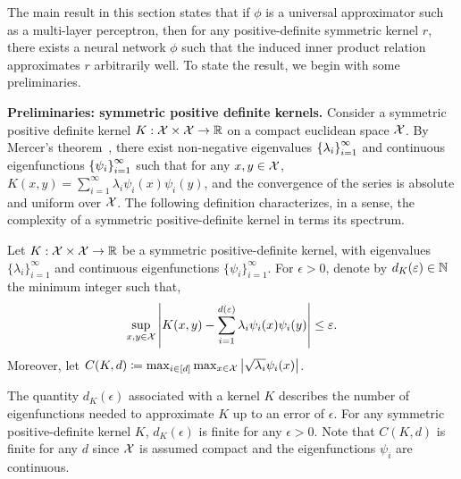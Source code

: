 The main result in this section states that if $\phi$ is a universal approximator such as a multi-layer perceptron, then for any positive-definite symmetric kernel $r$, there exists a neural network $\phi$ such that the induced inner product relation approximates $r$ arbitrarily well. To state the result, we begin with some preliminaries.

\textbf{Preliminaries: symmetric positive definite kernels.} Consider a symmetric positive definite kernel $K: {\mathcal{X}} \times {\mathcal{X}} \to \mathbb{R}$ on a compact euclidean space ${\mathcal{X}}$. By Mercer's theorem~\parencite{mercerFunctionsPositive1909, sunMercerTheorem2005, micchelliUniversalKernels2006}, there exist non-negative eigenvalues $\left\{\lambda_i\right\}_{i=1}^{\infty}$ and continuous eigenfunctions $\left\{\psi_i\right\}_{i=1}^{\infty}$ such that for any $x,y \in {\mathcal{X}}$, $K(x, y) = \sum_{i=1}^\infty \lambda_i \psi_i(x) \psi_i(y)$, and the convergence of the series is absolute and uniform over ${\mathcal{X}}$. The following definition characterizes, in a sense, the complexity of a symmetric positive-definite kernel in terms its spectrum.

\begin{assumption}\label{ass:sym_pd_ker_specturm_decay}
	Let $K: {\mathcal{X}} \times {\mathcal{X}} \to \mathbb{R}$ be a symmetric positive-definite kernel, with eigenvalues $\{\lambda_i\}_{i=1}^{\infty}$ and continuous eigenfunctions $\{\psi_i\}_{i=1}^{\infty}$. For $\epsilon > 0$, denote by $d_K(\varepsilon) \in \mathbb{N}$ the minimum integer such that,
	\begin{equation*}
		\sup_{x, y \in \calX} \abs{K(x, y) - \sum_{i=1}^{d(\epsilon)} \lambda_i \psi_i(x) \psi_i(y)} \leq \epsilon.
	\end{equation*}
	Moreover, let $C(K, d) \coloneq \max_{i \in [d]} \max_{x \in {\mathcal{X}}} \left\lvert\sqrt{\lambda_i} \psi_i(x)\right\rvert$.%
\end{assumption}

The quantity $d_K(\epsilon)$ associated with a kernel $K$ describes the number of eigenfunctions needed to approximate $K$ up to an error of $\epsilon$. For any symmetric positive-definite kernel $K$, $d_K(\epsilon)$ is finite for any $\epsilon > 0$. 
Note that $C(K, d)$ is finite for any $d$ since ${\mathcal{X}}$ is assumed compact and the eigenfunctions $\psi_i$ are continuous. %

